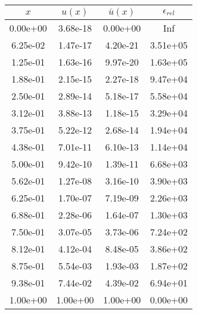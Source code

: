 \begin{tabular}{|c|c|c|c|}
\hline
\textbf{$x$}&\textbf{$u(x)$}&\textbf{$\bar{u}(x)$}&\textbf{$\epsilon_{rel}$}\\\hline
0.00e+00&3.68e-18&0.00e+00&Inf\\\hline
6.25e-02&1.47e-17&4.20e-21&3.51e+05\\\hline
1.25e-01&1.63e-16&9.97e-20&1.63e+05\\\hline
1.88e-01&2.15e-15&2.27e-18&9.47e+04\\\hline
2.50e-01&2.89e-14&5.18e-17&5.58e+04\\\hline
3.12e-01&3.88e-13&1.18e-15&3.29e+04\\\hline
3.75e-01&5.22e-12&2.68e-14&1.94e+04\\\hline
4.38e-01&7.01e-11&6.10e-13&1.14e+04\\\hline
5.00e-01&9.42e-10&1.39e-11&6.68e+03\\\hline
5.62e-01&1.27e-08&3.16e-10&3.90e+03\\\hline
6.25e-01&1.70e-07&7.19e-09&2.26e+03\\\hline
6.88e-01&2.28e-06&1.64e-07&1.30e+03\\\hline
7.50e-01&3.07e-05&3.73e-06&7.24e+02\\\hline
8.12e-01&4.12e-04&8.48e-05&3.86e+02\\\hline
8.75e-01&5.54e-03&1.93e-03&1.87e+02\\\hline
9.38e-01&7.44e-02&4.39e-02&6.94e+01\\\hline
1.00e+00&1.00e+00&1.00e+00&0.00e+00\\\hline
\end{tabular}
